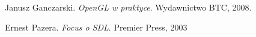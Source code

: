 \documentclass[12pt, a4paper, oneside]{Thesis} %
\begin{document}

\pagestyle{fancy}



\tableofcontents 



\mainmatter 

\pagestyle{fancy} 







\listoffigures %

\backmatter

\begin{thebibliography}{1}

Janusz Ganczarski. 
\emph{OpenGL w praktyce}. Wydawnictwo BTC, 2008.

Ernest Pazera. 
\emph{Focus o SDL}. Premier Press, 2003

\end{thebibliography}
\end{document}
